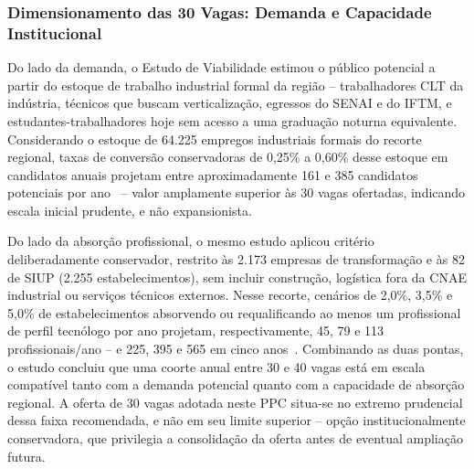 \subsubsection{Dimensionamento das 30 Vagas: Demanda e Capacidade Institucional}

Do lado da demanda, o Estudo de Viabilidade estimou o público potencial a partir do estoque de trabalho industrial formal da região -- trabalhadores CLT da indústria, técnicos que buscam verticalização, egressos do SENAI e do IFTM, e estudantes-trabalhadores hoje sem acesso a uma graduação noturna equivalente. Considerando o estoque de 64.225 empregos industriais formais do recorte regional, taxas de conversão conservadoras de 0,25\% a 0,60\% desse estoque em candidatos anuais projetam entre aproximadamente 161 e 385 candidatos potenciais por ano~\cite{ufu_estudo_viabilidade_cst_2026} -- valor amplamente superior às 30 vagas ofertadas, indicando escala inicial prudente, e não expansionista.

Do lado da absorção profissional, o mesmo estudo aplicou critério deliberadamente conservador, restrito às 2.173 empresas de transformação e às 82 de SIUP (2.255 estabelecimentos), sem incluir construção, logística fora da CNAE industrial ou serviços técnicos externos. Nesse recorte, cenários de 2,0\%, 3,5\% e 5,0\% de estabelecimentos absorvendo ou requalificando ao menos um profissional de perfil tecnólogo por ano projetam, respectivamente, 45, 79 e 113 profissionais/ano -- e 225, 395 e 565 em cinco anos~\cite{ufu_estudo_viabilidade_cst_2026}. Combinando as duas pontas, o estudo concluiu que uma coorte anual entre 30 e 40 vagas está em escala compatível tanto com a demanda potencial quanto com a capacidade de absorção regional. A oferta de 30 vagas adotada neste PPC situa-se no extremo prudencial dessa faixa recomendada, e não em seu limite superior -- opção institucionalmente conservadora, que privilegia a consolidação da oferta antes de eventual ampliação futura.

